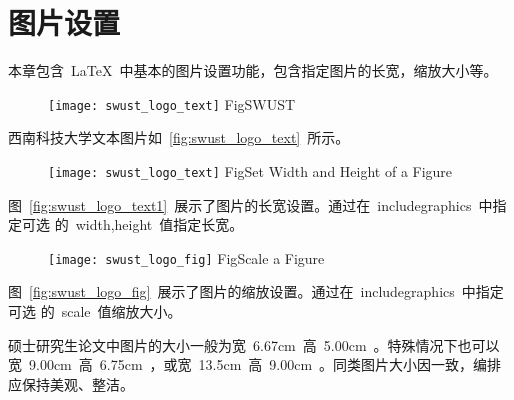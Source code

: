\chapter{图片设置}

本章包含~\LaTeX~中基本的图片设置功能，包含指定图片的长宽，缩放大小等。

\begin{figure}[ht]
  \centering
  \texttt{[image: swust\_logo\_text]}
            {Fig}{SWUST}
\end{figure}
西南科技大学文本图片如~\ref{fig:swust_logo_text}~所示。

\begin{figure}[ht]
  \centering
  \texttt{[image: swust\_logo\_text]}
            {Fig}{Set Width and Height of a Figure}
\end{figure}
图~\ref{fig:swust_logo_text1}~展示了图片的长宽设置。通过在~includegraphics~中指定可选
的~width,height~值指定长宽。

\begin{figure}[ht]
  \centering
  \texttt{[image: swust\_logo\_fig]}
            {Fig}{Scale a Figure}
\end{figure}

图~\ref{fig:swust_logo_fig}~展示了图片的缩放设置。通过在~includegraphics~中指定可选
的~scale~值缩放大小。

硕士研究生论文中图片的大小一般为宽~6.67cm~高~5.00cm~。特殊情况下也可以
宽~9.00cm~高~6.75cm~，或宽~13.5cm~高~9.00cm~。同类图片大小因一致，编排
应保持美观、整洁。
